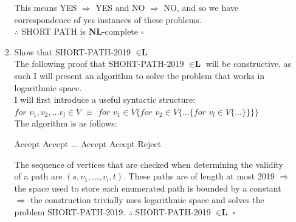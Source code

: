 \documentclass[12pt]{article}
\begin{document}
\begin{enumerate}
\begin{enumerate}
This means YES $\Rightarrow$ YES and NO $\Rightarrow$ NO, and so we have correspondence of yes instances of these problems. \\$\therefore$ SHORT PATH is $\textbf{NL}$-complete $\square $

\item Show that SHORT-PATH-2019 $\in \textbf{L}$ \\
The following proof that SHORT-PATH-2019 $\in  \textbf{L} $ will be constructive, as such I will present an algorithm to solve the problem that works in logarithmic space.\\
I will first introduce a useful syntactic structure:\\
$for$ $v_1,v_2,...v_l \in V$ $\equiv $ $for$ $v_1 \in V \{ for$ $v_2 \in V \{ ... \{for$ $v_l \in V \{...\}\}\}\} $\\
The algorithm is as follows:
\begin{algorithmic}
		\STATE Accept
	\ENDIF
\ENDFOR
{}
		\STATE Accept
	\ENDIF
\ENDFOR
...
		\STATE Accept
	\ENDIF
\ENDFOR
{}
		\STATE Accept
	\ENDIF
\ENDFOR
\STATE Reject
\end{algorithmic}
The sequence of vertices that are checked when determining the validity of a path are $(s,v_1,...,v_l,t)$. These paths are of length at most 2019 $\Rightarrow $ the space used to store each enumerated path is bounded by a constant $\Rightarrow $ the construction trivially uses logarithmic space and solves the problem SHORT-PATH-2019.
$\therefore $ SHORT-PATH-2019 $\in \textbf{L}$ $\square$


\end{enumerate}
\end{enumerate}
\end{document}

